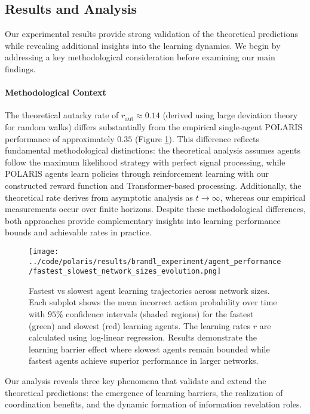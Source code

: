 \subsection{Results and Analysis}

Our experimental results provide strong validation of the theoretical predictions while revealing additional insights into the learning dynamics. We begin by addressing a key methodological consideration before examining our main findings.

\paragraph{Methodological Context} The theoretical autarky rate of $r_{\text{aut}} \approx 0.14$ (derived using large deviation theory for random walks) differs substantially from the empirical single-agent POLARIS performance of approximately $0.35$ (Figure \ref{fig:size_comparison}). This difference reflects fundamental methodological distinctions: the theoretical analysis assumes agents follow the maximum likelihood strategy with perfect signal processing, while POLARIS agents learn policies through reinforcement learning with our constructed reward function and Transformer-based processing. Additionally, the theoretical rate derives from asymptotic analysis as $t \to \infty$, whereas our empirical measurements occur over finite horizons. Despite these methodological differences, both approaches provide complementary insights into learning performance bounds and achievable rates in practice.

\begin{figure}[!htbp]
    \centering
    \texttt{[image: ../code/polaris/results/brandl\_experiment/agent\_performance/fastest\_slowest\_network\_sizes\_evolution.png]}
    \caption{Fastest vs slowest agent learning trajectories across network sizes. Each subplot shows the mean incorrect action probability over time with $95\%$ confidence intervals (shaded regions) for the fastest (green) and slowest (red) learning agents. The learning rates $r$ are calculated using log-linear regression. Results demonstrate the learning barrier effect where slowest agents remain bounded while fastest agents achieve superior performance in larger networks.}
    \label{fig:size_comparison}
\end{figure}

Our analysis reveals three key phenomena that validate and extend the theoretical predictions: the emergence of learning barriers, the realization of coordination benefits, and the dynamic formation of information revelation roles.

